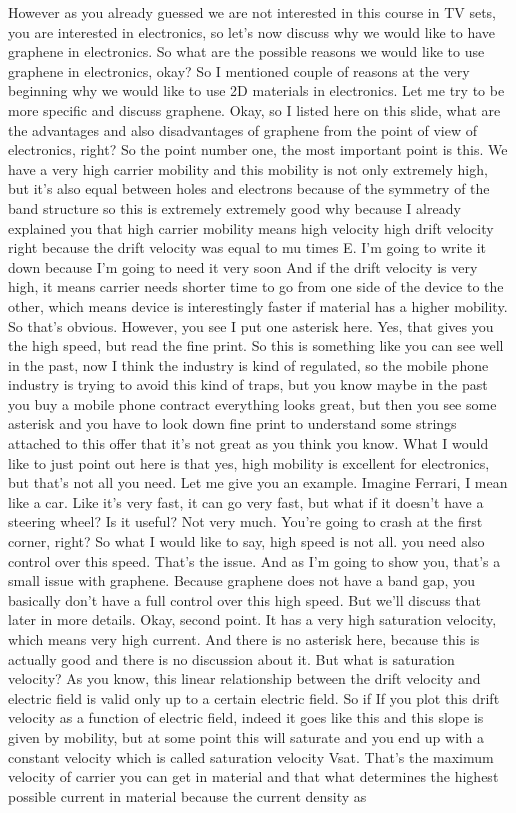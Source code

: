 However as you already guessed we are not interested in this course in TV sets, you are interested in electronics, so let's now discuss why we would like to have graphene in electronics. So what are the possible reasons we would like to use graphene in electronics, okay? So I mentioned couple of reasons at the very beginning why we would like to use 2D materials in electronics. Let me try to be more specific and discuss graphene. Okay, so I listed here on this slide, what are the advantages and also disadvantages of graphene from the point of view of electronics, right? So the point number one, the most important point is this. We have a very high carrier mobility and this mobility is not only extremely high, but it's also equal between holes and electrons because of the symmetry of the band structure so this is extremely extremely good why because I already explained you that high carrier mobility means high velocity high drift velocity right because the drift velocity was equal to mu times E. I'm going to write it down because I'm going to need it very soon And if the drift velocity is very high, it means carrier needs shorter time to go from one side of the device to the other, which means device is interestingly faster if material has a higher mobility. So that's obvious. However, you see I put one asterisk here. Yes, that gives you the high speed, but read the fine print. So this is something like you can see well in the past, now I think the industry is kind of regulated, so the mobile phone industry is trying to avoid this kind of traps, but you know maybe in the past you buy a mobile phone contract everything looks great, but then you see some asterisk and you have to look down fine print to understand some strings attached to this offer that it's not great as you think you know. What I would like to just point out here is that yes, high mobility is excellent for electronics, but that's not all you need. Let me give you an example. Imagine Ferrari, I mean like a car. Like it's very fast, it can go very fast, but what if it doesn't have a steering wheel? Is it useful? Not very much. You're going to crash at the first corner, right? So what I would like to say, high speed is not all. you need also control over this speed. That's the issue. And as I'm going to show you, that's a small issue with graphene. Because graphene does not have a band gap, you basically don't have a full control over this high speed. But we'll discuss that later in more details. Okay, second point. It has a very high saturation velocity, which means very high current. And there is no asterisk here, because this is actually good and there is no discussion about it. But what is saturation velocity? As you know, this linear relationship between the drift velocity and electric field is valid only up to a certain electric field. So if If you plot this drift velocity as a function of electric field, indeed it goes like this and this slope is given by mobility, but at some point this will saturate and you end up with a constant velocity which is called saturation velocity Vsat. That's the maximum velocity of carrier you can get in material and that what determines the highest possible current in material because the current density as 